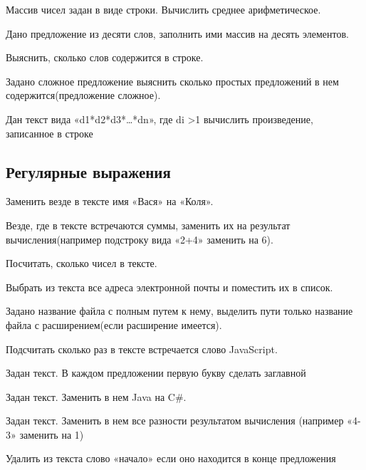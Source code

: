 \task Массив чисел задан в виде строки. Вычислить среднее
арифметическое.

\task Дано предложение из десяти слов, заполнить ими массив на десять
элементов.

\task Выяснить, сколько слов содержится в строке.

\task Задано сложное предложение выяснить сколько простых предложений
в нем содержится(предложение сложное).

\task Дан текст вида «d1*d2*d3*…*dn», где di >1 вычислить
произведение, записанное в строке

\subsection{Регулярные выражения}

\task Заменить везде в тексте имя «Вася» на «Коля».

\task Везде, где в тексте встречаются суммы, заменить их на результат
вычисления(например подстроку вида «2+4» заменить на 6).

\task Посчитать, сколько чисел в тексте.

\task Выбрать из текста все адреса электронной почты и поместить их в
список.

\task Задано название файла с полным путем к нему, выделить пути
только название файла с расширением(если расширение имеется).

\task Подсчитать сколько раз в тексте встречается слово JavaScript.

\task Задан текст. В каждом предложении первую букву сделать заглавной

\task Задан текст. Заменить в нем Java на C\#.

\task Задан текст. Заменить в нем все разности результатом вычисления
(например «4-3» заменить на 1)

\task Удалить из текста слово «начало» если оно находится в конце
предложения

